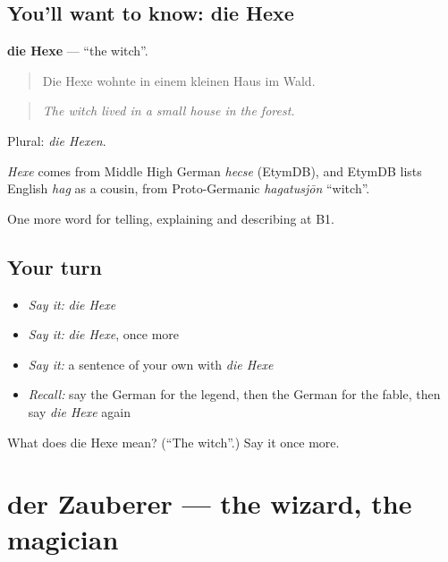 \subsection*{You'll want to know: die Hexe}
\textbf{die Hexe} — \textquotedblleft{}the witch\textquotedblright{}.

\begin{quote}
Die Hexe wohnte in einem kleinen Haus im Wald.
\end{quote}

\begin{quote}
\emph{The witch lived in a small house in the forest.}
\end{quote}

Plural: \emph{die Hexen}.

\begin{cousinweb}
\emph{Hexe} comes from Middle High German \emph{hecse} (EtymDB), and EtymDB lists English \emph{hag} as a cousin, from Proto-Germanic \emph{hagatusjōn} \textquotedblleft{}witch\textquotedblright{}.
\end{cousinweb}

\begin{grammarlens}[title={What you've built}]
One more word for telling, explaining and describing at B1.
\end{grammarlens}

\subsection*{Your turn}
\begin{itemize}
\raggedright
  \item \emph{Say it:} \emph{die Hexe}
  \item \emph{Say it:} \emph{die Hexe}, once more
  \item \emph{Say it:} a sentence of your own with \emph{die Hexe}
  \item \emph{Recall:} say the German for the legend, then the German for the fable, then say \emph{die Hexe} again
\end{itemize}

\begin{tcolorbox}[breakable,colback=teal!4,colframe=teal!35!black,title={Before you move on}]
What does die Hexe mean? (\textquotedblleft{}The witch\textquotedblright{}.) Say it once more.
\end{tcolorbox}
\section[der Zauberer]{der Zauberer — the wizard, the magician}

